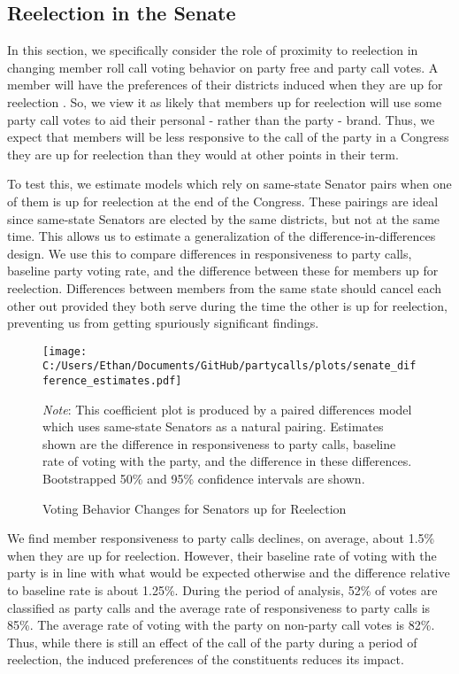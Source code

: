 \documentclass[12pt]{article}
\newcommand\fnote[1]{\captionsetup{font=small}\caption*{#1}}
\begin{document}
\subsection*{Reelection in the Senate}

In this section, we specifically consider the role of proximity to reelection in changing member roll call voting behavior on party free and party call votes. A member will have the preferences of their districts induced when they are up for reelection \cite{Levitt:1996}. So, we view it as likely that members up for reelection will use some party call votes to aid their personal - rather than the party - brand. Thus, we expect that members will be less responsive to the call of the party in a Congress they are up for reelection than they would at other points in their term.

To test this, we estimate models which rely on same-state Senator pairs when one of them is up for reelection at the end of the Congress. These pairings are ideal since same-state Senators are elected by the same districts, but not at the same time. This allows us to estimate a generalization of the difference-in-differences design. We use this to compare differences in responsiveness to party calls, baseline party voting rate, and the difference between these for members up for reelection. Differences between members from the same state should cancel each other out provided they both serve during the time the other is up for reelection, preventing us from getting spuriously significant findings.

\begin{figure}[H]
	\centering
	\caption{Voting Behavior Changes for Senators up for Reelection}
	\texttt{[image: C:/Users/Ethan/Documents/GitHub/partycalls/plots/senate\_difference\_estimates.pdf]}
	\fnote{\textit{Note}: This coefficient plot is produced by a paired differences model which uses same-state Senators as a natural pairing. Estimates shown are the difference in responsiveness to party calls, baseline rate of voting with the party, and the difference in these differences. Bootstrapped 50\% and 95\% confidence intervals are shown.}
\end{figure}

We find member responsiveness to party calls declines, on average, about 1.5\% when they are up for reelection. However, their baseline rate of voting with the party is in line with what would be expected otherwise and the difference relative to baseline rate is about 1.25\%. During the period of analysis, 52\% of votes are classified as party calls and the average rate of responsiveness to party calls is 85\%. The average rate of voting with the party on non-party call votes is 82\%. Thus, while there is still an effect of the call of the party during a period of reelection, the induced preferences of the constituents reduces its impact.
\end{document}
